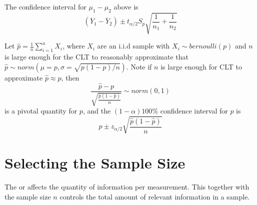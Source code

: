 \documentclass[12pt, a4paper, twoside, openright, titlepage]{book}
\begin{document}
\begin{cor}{}{}
    The confidence interval for $\mu_1 - \mu_2$ above is \begin{equation*}
        (\overline{Y}_1 - \overline{Y}_2) \pm t_{\alpha/2}S_p\sqrt{\frac{1}{n_1}+\frac{1}{n_2}}
    \end{equation*}
\end{cor}

\begin{rmk}{}{}
    Let $\hat{p} = \frac{1}{n}\sum_{i=1}^nX_i$, where $X_i$ are an i.i.d sample with $X_i \sim bernoulli(p)$ and $n$ is large enough for the CLT to reasonably approximate that $\hat{p}\sim norm(\mu = p, \sigma = \sqrt{p(1-p)/n})$. Note if $n$ is large enough for CLT to approximate $\hat{p} \approx p$, then \begin{equation*}
        \frac{\hat{p}-p}{\sqrt{\frac{\hat{p}(1-\hat{p})}{n}}} \sim norm(0,1)
    \end{equation*}
    is a pivotal quantity for $p$, and the $(1-\alpha)100\%$ confidence interval for $p$ is \begin{equation*}
        \hat{p} \pm z_{\alpha/2}\sqrt{\frac{\hat{p}(1-\hat{p})}{n}}
    \end{equation*}
\end{rmk}




\section{\textsection Selecting the Sample Size}


\begin{defn}{}{}
    The  or  affects the quantity of information per measurement. This together with the sample size $n$ controls the total amount of relevant information in a sample.
\end{defn}
\end{document}
